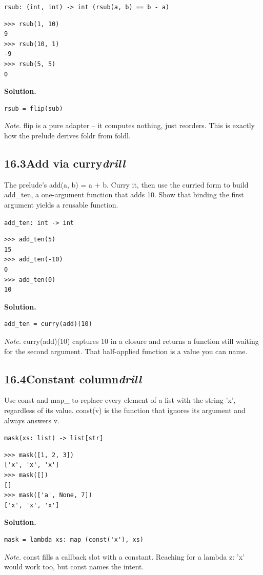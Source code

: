 \documentclass[10pt,letterpaper]{book}
\begin{document}
\noindent\texttt{rsub: (int, int) -> int   (rsub(a, b) == b - a)}
\begin{lstlisting}[style=ex]
>>> rsub(1, 10)
9
>>> rsub(10, 1)
-9
>>> rsub(5, 5)
0
\end{lstlisting}
\noindent\textbf{Solution.}
\begin{lstlisting}[style=code]
rsub = flip(sub)
\end{lstlisting}
\noindent\textit{Note.} flip is a pure adapter -- it computes nothing, just reorders. This is exactly how the prelude derives foldr from foldl.

\subsection*{16.3\quad Add via curry\hfill\textnormal{\textit{drill}}}
The prelude's add(a, b) = a + b. Curry it, then use the curried form to build add\_ten, a one-argument function that adds 10. Show that binding the first argument yields a reusable function.

\noindent\texttt{add\_ten: int -> int}
\begin{lstlisting}[style=ex]
>>> add_ten(5)
15
>>> add_ten(-10)
0
>>> add_ten(0)
10
\end{lstlisting}
\noindent\textbf{Solution.}
\begin{lstlisting}[style=code]
add_ten = curry(add)(10)
\end{lstlisting}
\noindent\textit{Note.} curry(add)(10) captures 10 in a closure and returns a function still waiting for the second argument. That half-applied function is a value you can name.

\subsection*{16.4\quad Constant column\hfill\textnormal{\textit{drill}}}
Use const and map\_ to replace every element of a list with the string 'x', regardless of its value. const(v) is the function that ignores its argument and always answers v.

\noindent\texttt{mask(xs: list) -> list[str]}
\begin{lstlisting}[style=ex]
>>> mask([1, 2, 3])
['x', 'x', 'x']
>>> mask([])
[]
>>> mask(['a', None, 7])
['x', 'x', 'x']
\end{lstlisting}
\noindent\textbf{Solution.}
\begin{lstlisting}[style=code]
mask = lambda xs: map_(const('x'), xs)
\end{lstlisting}
\noindent\textit{Note.} const fills a callback slot with a constant. Reaching for a lambda z: 'x' would work too, but const names the intent.
\end{document}
